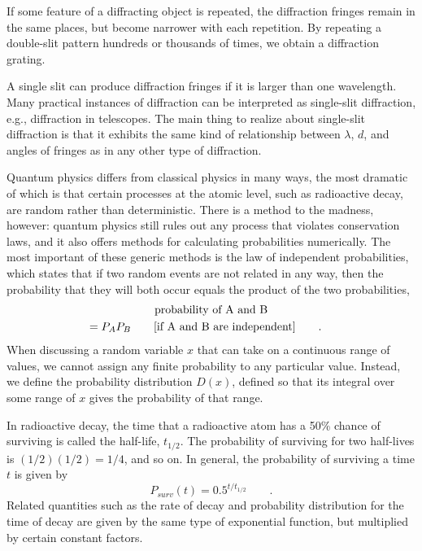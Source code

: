 If some feature of a diffracting object is repeated, the
diffraction fringes remain in the same places, but become
narrower with each repetition. By repeating a double-slit
pattern hundreds or thousands of times, we obtain a
diffraction grating.

A single slit can produce diffraction fringes if it is
larger than one wavelength. Many practical instances of
diffraction can be interpreted as single-slit diffraction,
e.g., diffraction in telescopes. The main thing to realize
about single-slit diffraction is that it exhibits the same
kind of relationship between $\lambda$, $d$, and angles of
fringes as in any other type of diffraction.

Quantum physics differs from classical physics in many ways,
the most dramatic of which is that certain processes at the
atomic level, such as radioactive decay, are random rather
than deterministic. There is a method to the madness,
however: quantum physics still rules out any process that
violates conservation laws, and it also offers methods for
calculating probabilities numerically.
The most important of these generic methods
is the law of independent probabilities, which states that
if two random events are not related in any way, then the
probability that they will both occur equals the product of
the two probabilities,
\begin{multline*}
        \text{probability of A and B}  \\=  P_AP_B  \qquad \shoveright{\text{[if A and B are independent]}   \qquad   .}
\end{multline*}
When discussing a random variable $x$ that can take on a continuous
range of values, we cannot assign any finite probability to
any particular value. Instead, we define the probability distribution
$D(x)$, defined so that its integral over some range of $x$ gives
the probability of that range.

In radioactive decay, the
time that a radioactive atom has a 50\% chance of surviving
is called the half-life, $t_{1/2}$. The probability of surviving
for two half-lives is $(1/2)(1/2)=1/4$, and so on. In
general, the probability of surviving a time $t$ is given by
\begin{equation*}
		P_{surv}(t)  =    0.5^{t/t_{1/2}} \qquad .
\end{equation*}
Related quantities such as the rate of decay and probability
distribution for the time of decay are given by the same
type of exponential function, but multiplied by certain constant factors.

